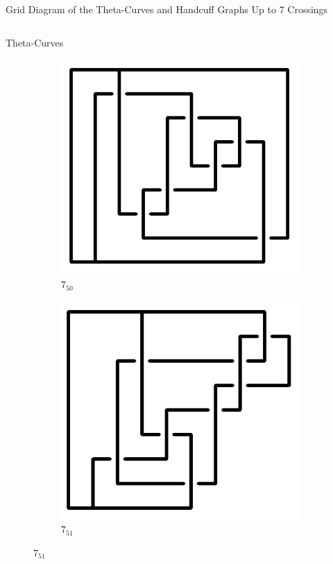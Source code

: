 \documentclass[final]{beamer}
\begin{document}
\begin{frame}[t]
\begin{alertblock}{Grid Diagram of the Theta-Curves and Handcuff Graphs Up to 7 Crossings}
\begin{columns}[t]
\begin{column}{0.5\textwidth}
\begin{alertblock}{Theta-Curves}
\begin{figure}
\begin{subfigure}{0.075\textwidth}
    \includegraphics[width=\columnwidth]{../Midterm_Poster/grid_diagram/theta_7_50.png}
    \caption{$7_{50}$} 
    \end{subfigure}
    \begin{subfigure}{0.075\textwidth}
    \includegraphics[width=\columnwidth]{../Midterm_Poster/grid_diagram/theta_7_51.png}
    \caption{$7_{51}$} 
    \end{subfigure}

\end{figure}
\end{alertblock}
\end{column}
\end{columns}
\end{alertblock}
\end{frame}
\end{document}

